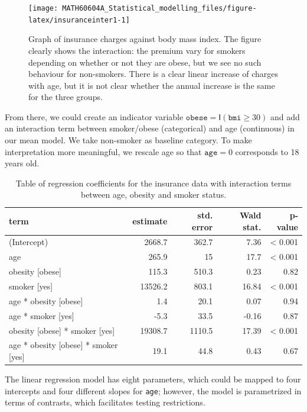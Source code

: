 \documentclass[
  11pt,
  letterpaper,
]{book}
\theoremstyle{definition}
\theoremstyle{definition}
\theoremstyle{definition}
\theoremstyle{definition}
\theoremstyle{remark}
\begin{document}
\begin{figure}

{\centering \texttt{[image: MATH60604A\_Statistical\_modelling\_files/figure-latex/insuranceinter1-1]} 

}

\caption{Graph of insurance charges against body mass index. The figure clearly shows the interaction: the premium vary for smokers depending on whether or not they are obese, but we see no such behaviour for non-smokers. There is a clear linear increase of charges with age, but it is not clear whether the annual increase is the same for the three groups.}\label{fig:insuranceinter1}
\end{figure}

From there, we could create an indicator variable \(\texttt{obese}=\mathsf{I}(\texttt{bmi} \geq 30)\) and add an interaction term between smoker/obese (categorical) and age (continuous) in our mean model. We take non-smoker as baseline category. To make interpretation more meaningful, we rescale age so that \(\texttt{age}=0\) corresponds to 18 years old.

\begin{table}

\caption{\label{tab:coefintercharges}Table of regression coefficients for the insurance data with interaction terms between age, obesity and smoker status.}
\centering
\begin{tabular}[t]{lrrrr}
\toprule
term & estimate & std. error & Wald stat. & p-value\\
\midrule
(Intercept) & 2668.7 & 362.7 & 7.36 & < 0.001\\
age & 265.9 & 15 & 17.7 & < 0.001\\
obesity [obese] & 115.3 & 510.3 & 0.23 & 0.82\\
smoker [yes] & 13526.2 & 803.1 & 16.84 & < 0.001\\
age * obesity [obese] & 1.4 & 20.1 & 0.07 & 0.94\\
\addlinespace
age * smoker [yes] & -5.3 & 33.5 & -0.16 & 0.87\\
obesity [obese] * smoker [yes] & 19308.7 & 1110.5 & 17.39 & < 0.001\\
age * obesity [obese] * smoker [yes] & 19.1 & 44.8 & 0.43 & 0.67\\
\bottomrule
\end{tabular}
\end{table}

The linear regression model has eight parameters, which could be mapped to four intercepts and four different slopes for \texttt{age}; however, the model is parametrized in terms of contrasts, which facilitates testing restrictions.
\end{document}
